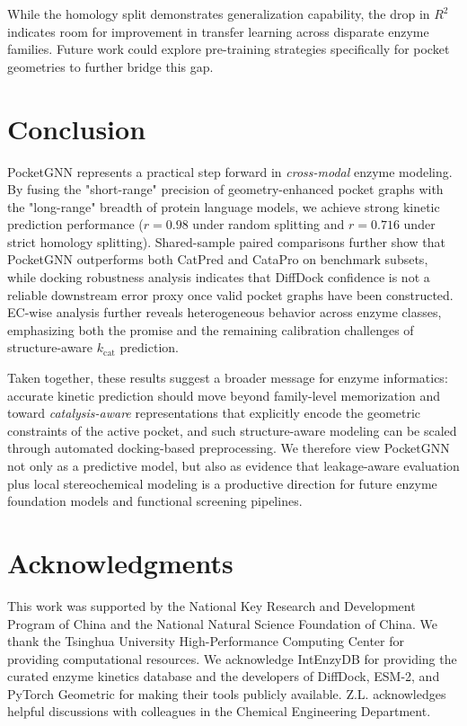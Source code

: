 \documentclass[11pt]{article}
\begin{document}
While the homology split demonstrates generalization capability, the drop in $R^2$ indicates room for improvement in transfer learning across disparate enzyme families. Future work could explore pre-training strategies specifically for pocket geometries to further bridge this gap.

\section{Conclusion}
\label{sec:conclusion}

PocketGNN represents a practical step forward in \emph{cross-modal} enzyme modeling. By fusing the "short-range" precision of geometry-enhanced pocket graphs with the "long-range" breadth of protein language models, we achieve strong kinetic prediction performance ($r=0.98$ under random splitting and $r=0.716$ under strict homology splitting). Shared-sample paired comparisons further show that PocketGNN outperforms both CatPred and CataPro on benchmark subsets, while docking robustness analysis indicates that DiffDock confidence is not a reliable downstream error proxy once valid pocket graphs have been constructed. EC-wise analysis further reveals heterogeneous behavior across enzyme classes, emphasizing both the promise and the remaining calibration challenges of structure-aware $k_{\text{cat}}$ prediction.

Taken together, these results suggest a broader message for enzyme informatics: accurate kinetic prediction should move beyond family-level memorization and toward \emph{catalysis-aware} representations that explicitly encode the geometric constraints of the active pocket, and such structure-aware modeling can be scaled through automated docking-based preprocessing. We therefore view PocketGNN not only as a predictive model, but also as evidence that leakage-aware evaluation plus local stereochemical modeling is a productive direction for future enzyme foundation models and functional screening pipelines.

\section*{Acknowledgments}
This work was supported by the National Key Research and Development Program of China and the National Natural Science Foundation of China. We thank the Tsinghua University High-Performance Computing Center for providing computational resources. We acknowledge IntEnzyDB for providing the curated enzyme kinetics database and the developers of DiffDock, ESM-2, and PyTorch Geometric for making their tools publicly available. Z.L. acknowledges helpful discussions with colleagues in the Chemical Engineering Department.
\end{document}
